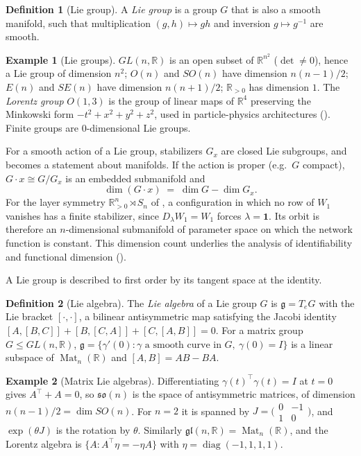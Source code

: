 \documentclass[11pt]{article}
\theoremstyle{plain}
\theoremstyle{definition}
\newtheorem{Definition}{Definition}[section]
\newtheorem{Example}{Example}[section]
\begin{document}
\begin{Definition}[Lie group]\label{def:lie-group}
A \emph{Lie group} is a group $G$ that is also a smooth manifold, such that multiplication $(g,h)\mapsto gh$ and inversion $g\mapsto g^{-1}$ are smooth.
\end{Definition}

\begin{Example}[Lie groups]\label{ex:lie-groups}
$GL(n,\mathbb{R})$ is an open subset of $\mathbb{R}^{n^2}$ ($\det\neq 0$), hence a Lie group of dimension $n^2$; $O(n)$ and $SO(n)$ have dimension $n(n-1)/2$; $E(n)$ and $SE(n)$ have dimension $n(n+1)/2$; $\mathbb{R}_{>0}$ has dimension $1$.
The \emph{Lorentz group} $O(1,3)$ is the group of linear maps of $\mathbb{R}^4$ preserving the Minkowski form $-t^2+x^2+y^2+z^2$, used in particle-physics architectures ().
Finite groups are $0$-dimensional Lie groups.
\end{Example}

For a smooth action of a Lie group, stabilizers $G_x$ are closed Lie subgroups, and  becomes a statement about manifolds.
If the action is proper (e.g.\ $G$ compact), $G\cdot x\cong G/G_x$ is an embedded submanifold and
\[
    \dim(G\cdot x) \;=\; \dim G - \dim G_x .
\]
For the layer symmetry $\mathbb{R}^n_{>0}\rtimes S_n$ of , a configuration in which no row of $W_1$ vanishes has a finite stabilizer, since $D_\lambda W_1 = W_1$ forces $\lambda = \mathbf{1}$.
Its orbit is therefore an $n$-dimensional submanifold of parameter space on which the network function is constant.
This dimension count underlies the analysis of identifiability and functional dimension ().

A Lie group is described to first order by its tangent space at the identity.

\begin{Definition}[Lie algebra]\label{def:lie-algebra}
The \emph{Lie algebra} of a Lie group $G$ is $\mathfrak{g} = T_eG$ with the Lie bracket $[\cdot,\cdot]$, a bilinear antisymmetric map satisfying the Jacobi identity $[A,[B,C]]+[B,[C,A]]+[C,[A,B]] = 0$.
For a matrix group $G\leq GL(n,\mathbb{R})$, $\mathfrak{g} = \{\gamma'(0) : \gamma \text{ a smooth curve in } G,\ \gamma(0) = I\}$ is a linear subspace of $\operatorname{Mat}_n(\mathbb{R})$ and $[A,B] = AB-BA$.
\end{Definition}

\begin{Example}[Matrix Lie algebras]\label{ex:matrix-lie-algebras}
Differentiating $\gamma(t)^\top\gamma(t) = I$ at $t=0$ gives $A^\top + A = 0$, so $\mathfrak{so}(n)$ is the space of antisymmetric matrices, of dimension $n(n-1)/2 = \dim SO(n)$.
For $n=2$ it is spanned by $J = \bigl(\begin{smallmatrix}0&-1\\1&0\end{smallmatrix}\bigr)$, and $\exp(\theta J)$ is the rotation by $\theta$.
Similarly $\mathfrak{gl}(n,\mathbb{R}) = \operatorname{Mat}_n(\mathbb{R})$, and the Lorentz algebra is $\{A : A^\top\eta = -\eta A\}$ with $\eta = \operatorname{diag}(-1,1,1,1)$.
\end{Example}
\end{document}
